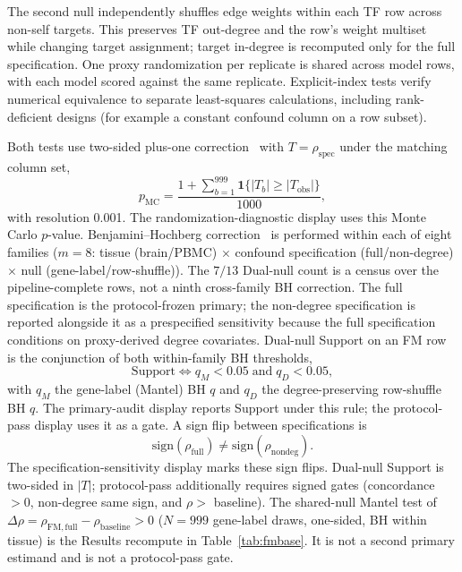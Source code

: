\documentclass[fleqn,10pt,lineno]{wlpeerj}
\begin{document}
The second null independently shuffles edge weights within each TF row across non-self targets. This
preserves TF out-degree and the row's weight multiset while changing target assignment; target
in-degree is recomputed only for the full specification. One proxy randomization per replicate is
shared across model rows, with each model scored against the same replicate. Explicit-index tests
verify numerical equivalence to separate least-squares calculations, including rank-deficient
designs (for example a constant confound column on a row subset).

Both tests use two-sided plus-one correction~\citep{phipson2010permutation} with
$T=\rho_{\mathrm{spec}}$ under the matching column set,
\begin{equation}
\label{eq:plus-one}
 p_{\mathrm{MC}}=\frac{1+\sum_{b=1}^{999}\mathbf{1}\{|T_b|\ge |T_{\mathrm{obs}}|\}}{1000},
\end{equation}
with resolution 0.001. The randomization-diagnostic display uses this Monte Carlo $p$-value.
Benjamini--Hochberg correction~\citep{benjamini1995fdr} is performed within
each of eight families ($m=8$: tissue (brain/PBMC) $\times$ confound specification (full/non-degree)
$\times$ null (gene-label/row-shuffle)). The $7/13$ Dual-null count is a census over the
pipeline-complete rows, not a ninth cross-family BH correction. The full specification is the protocol-frozen primary;
the non-degree specification is reported alongside it as a prespecified sensitivity because the
full specification conditions on proxy-derived degree covariates.
Dual-null Support on an FM row is the conjunction of both within-family BH thresholds,
\begin{equation}
\label{eq:dual-null}
\mathrm{Support}
\iff
q_M<0.05
\;\text{and}\;
q_D<0.05,
\end{equation}
with $q_M$ the gene-label (Mantel) BH $q$ and $q_D$ the degree-preserving row-shuffle BH $q$.
The primary-audit display reports Support under this rule; the protocol-pass display uses it as a gate.
A sign flip between specifications is
\begin{equation}
\label{eq:sign-flip}
\mathrm{sign}(\rho_{\mathrm{full}})
\neq
\mathrm{sign}(\rho_{\mathrm{nondeg}}).
\end{equation}
The specification-sensitivity display marks these sign flips. Dual-null Support is two-sided in
$|T|$; protocol-pass additionally requires signed gates (concordance $>0$, non-degree same sign,
and $\rho>$ baseline).
The shared-null Mantel test of
$\Delta\rho=\rho_{\mathrm{FM,full}}-\rho_{\mathrm{baseline}}>0$
($N=999$ gene-label draws, one-sided, BH within tissue) is the Results recompute in
Table~\ref{tab:fmbase}. It is not a second primary estimand and is not a protocol-pass gate.
\end{document}
